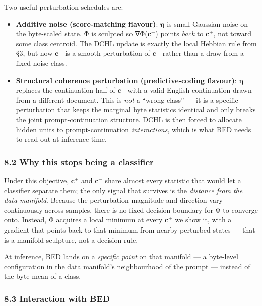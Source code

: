 \documentclass[
  11pt,
  a4paper,
]{article}
\providecommand{\tightlist}{%
  \setlength{\itemsep}{0pt}\setlength{\parskip}{0pt}}
\begin{document}
Two useful perturbation schedules are:

\begin{itemize}
\tightlist
\item
  \textbf{Additive noise (score-matching flavour)}:
  \(\boldsymbol{\eta}\) is small Gaussian noise on the byte-scaled
  state. Φ is sculpted so ∇Φ(\(\mathbf{c}^{+}\)) points \emph{back} to
  \(\mathbf{c}^{+}\), not toward some class centroid. The DCHL update is
  exactly the local Hebbian rule from §3, but now \(\mathbf{c}^{-}\) is
  a smooth perturbation of \(\mathbf{c}^{+}\) rather than a draw from a
  fixed noise class.
\item
  \textbf{Structural coherence perturbation (predictive-coding
  flavour)}: \(\boldsymbol{\eta}\) replaces the continuation half of
  \(\mathbf{c}^{+}\) with a valid English continuation drawn from a
  different document. This is \emph{not} a ``wrong class'' --- it is a
  specific perturbation that keeps the marginal byte statistics
  identical and only breaks the joint prompt-continuation structure.
  DCHL is then forced to allocate hidden units to prompt-continuation
  \emph{interactions}, which is what BED needs to read out at inference
  time.
\end{itemize}

\subsubsection{8.2 Why this stops being a
classifier}\label{why-this-stops-being-a-classifier}

Under this objective, \(\mathbf{c}^{+}\) and \(\mathbf{c}^{-}\) share
almost every statistic that would let a classifier separate them; the
only signal that survives is the \emph{distance from the data manifold}.
Because the perturbation magnitude and direction vary continuously
across samples, there is no fixed decision boundary for Φ to converge
onto. Instead, Φ acquires a local minimum at every \(\mathbf{c}^{+}\) we
show it, with a gradient that points back to that minimum from nearby
perturbed states --- that is a manifold sculpture, not a decision rule.

At inference, BED lands on a \emph{specific point} on that manifold ---
a byte-level configuration in the data manifold's neighbourhood of the
prompt --- instead of the byte mean of a class.

\subsubsection{8.3 Interaction with BED}\label{interaction-with-bed}
\end{document}
